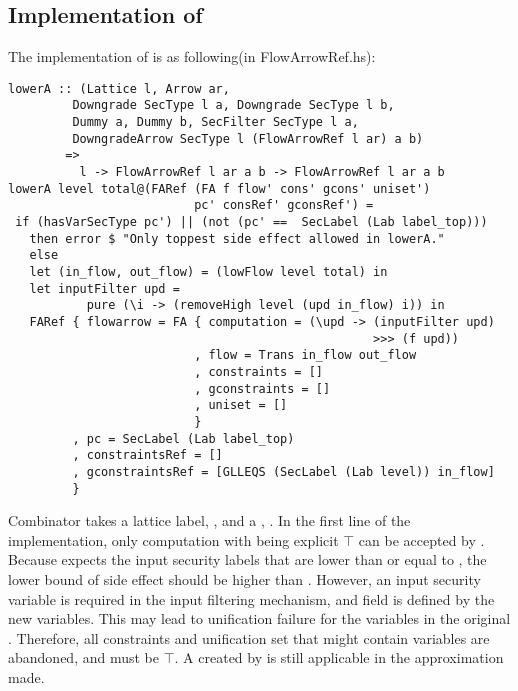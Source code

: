 \subsection{Implementation of }
The implementation of  is as following(in FlowArrowRef.hs):
\begin{verbatim}
lowerA :: (Lattice l, Arrow ar,
         Downgrade SecType l a, Downgrade SecType l b,
         Dummy a, Dummy b, SecFilter SecType l a,
         DowngradeArrow SecType l (FlowArrowRef l ar) a b)
        =>
          l -> FlowArrowRef l ar a b -> FlowArrowRef l ar a b
lowerA level total@(FARef (FA f flow' cons' gcons' uniset') 
                          pc' consRef' gconsRef') =
 if (hasVarSecType pc') || (not (pc' ==  SecLabel (Lab label_top)))
   then error $ "Only toppest side effect allowed in lowerA."
   else
   let (in_flow, out_flow) = (lowFlow level total) in
   let inputFilter upd = 
           pure (\i -> (removeHigh level (upd in_flow) i)) in
   FARef { flowarrow = FA { computation = (\upd -> (inputFilter upd) 
                                                   >>> (f upd))
                          , flow = Trans in_flow out_flow
                          , constraints = []
                          , gconstraints = []
                          , uniset = []
                          }
         , pc = SecLabel (Lab label_top)
         , constraintsRef = []
         , gconstraintsRef = [GLLEQS (SecLabel (Lab level)) in_flow]
         }
\end{verbatim}
Combinator  takes a lattice label, , and a , .
In the first line of the implementation, only computation with  being explicit $\top$ can 
be accepted by . Because  expects the input security labels that are lower than
or equal to , the lower bound of side effect should be higher than . However,
an input security variable is required in the input filtering mechanism, and field  is defined
by the new variables. This may lead to unification failure for the variables in the original .
Therefore, all constraints and unification set that might contain variables are abandoned, and 
must be $\top$. A  created by  is still applicable in the approximation made.

